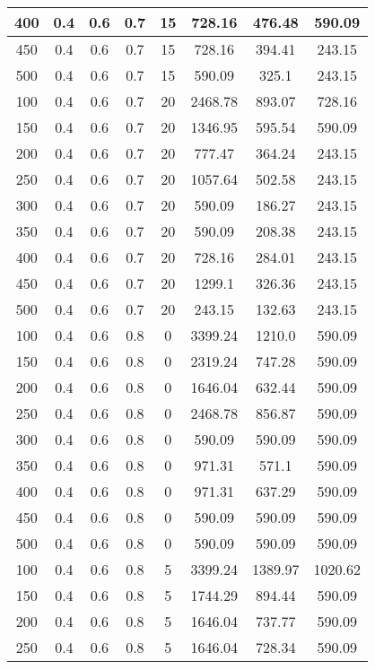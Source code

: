\documentclass[a4paper, 12pt]{extreport}
\begin{document}
\begin{itemize}
\begin{longtable}{|c|c|c|c|c|c|c|c|}
			400 & 0.4 & 0.6 & 0.7 & 15 & 728.16 & 476.48 & 590.09 \\\hline
			450 & 0.4 & 0.6 & 0.7 & 15 & 728.16 & 394.41 & 243.15 \\\hline
			500 & 0.4 & 0.6 & 0.7 & 15 & 590.09 & 325.1 & 243.15 \\\hline
			100 & 0.4 & 0.6 & 0.7 & 20 & 2468.78 & 893.07 & 728.16 \\\hline
			150 & 0.4 & 0.6 & 0.7 & 20 & 1346.95 & 595.54 & 590.09 \\\hline
			200 & 0.4 & 0.6 & 0.7 & 20 & 777.47 & 364.24 & 243.15 \\\hline
			250 & 0.4 & 0.6 & 0.7 & 20 & 1057.64 & 502.58 & 243.15 \\\hline
			300 & 0.4 & 0.6 & 0.7 & 20 & 590.09 & 186.27 & 243.15 \\\hline
			350 & 0.4 & 0.6 & 0.7 & 20 & 590.09 & 208.38 & 243.15 \\\hline
			400 & 0.4 & 0.6 & 0.7 & 20 & 728.16 & 284.01 & 243.15 \\\hline
			450 & 0.4 & 0.6 & 0.7 & 20 & 1299.1 & 326.36 & 243.15 \\\hline
			500 & 0.4 & 0.6 & 0.7 & 20 & 243.15 & 132.63 & 243.15 \\\hline
			100 & 0.4 & 0.6 & 0.8 & 0 & 3399.24 & 1210.0 & 590.09 \\\hline
			150 & 0.4 & 0.6 & 0.8 & 0 & 2319.24 & 747.28 & 590.09 \\\hline
			200 & 0.4 & 0.6 & 0.8 & 0 & 1646.04 & 632.44 & 590.09 \\\hline
			250 & 0.4 & 0.6 & 0.8 & 0 & 2468.78 & 856.87 & 590.09 \\\hline
			300 & 0.4 & 0.6 & 0.8 & 0 & 590.09 & 590.09 & 590.09 \\\hline
			350 & 0.4 & 0.6 & 0.8 & 0 & 971.31 & 571.1 & 590.09 \\\hline
			400 & 0.4 & 0.6 & 0.8 & 0 & 971.31 & 637.29 & 590.09 \\\hline
			450 & 0.4 & 0.6 & 0.8 & 0 & 590.09 & 590.09 & 590.09 \\\hline
			500 & 0.4 & 0.6 & 0.8 & 0 & 590.09 & 590.09 & 590.09 \\\hline
			100 & 0.4 & 0.6 & 0.8 & 5 & 3399.24 & 1389.97 & 1020.62 \\\hline
			150 & 0.4 & 0.6 & 0.8 & 5 & 1744.29 & 894.44 & 590.09 \\\hline
			200 & 0.4 & 0.6 & 0.8 & 5 & 1646.04 & 737.77 & 590.09 \\\hline
			250 & 0.4 & 0.6 & 0.8 & 5 & 1646.04 & 728.34 & 590.09 \\\hline

\end{longtable}
\end{itemize}
\end{document}
